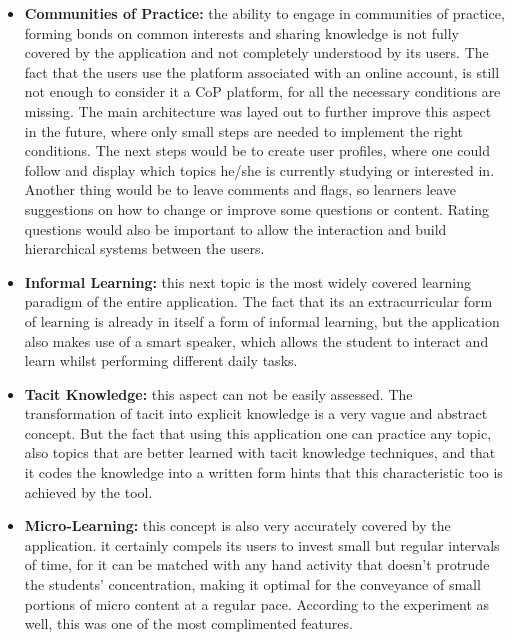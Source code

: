 \begin{itemize}
    \item \textbf{Communities of Practice: } the ability to engage in communities of practice, forming 
        bonds on common interests and sharing knowledge is not fully covered by the application and 
        not completely understood by its users. The fact that the users use the platform associated 
        with an online account, is still not enough to consider it a CoP platform, for all the necessary
        conditions are missing. The main architecture was layed out to further improve this aspect in
        the future, where only small steps are needed to implement the right conditions. The next steps
        would be to create user profiles, where one could follow and display which topics he/she is 
        currently studying or interested in. Another thing would be to leave comments and flags, so 
        learners leave suggestions on how to change or improve some questions or content. Rating questions
        would also be important to allow the interaction and build hierarchical systems between the users.
    \item \textbf{Informal Learning: } this next topic is the most widely covered learning paradigm 
        of the entire application. The fact that its an extracurricular form of learning is already
        in itself a form of informal learning, but the application also makes use of a smart speaker, 
        which allows the student to interact and learn whilst performing different daily tasks. 
    \item \textbf{Tacit Knowledge: } this aspect can not be easily assessed. The transformation of
        tacit into explicit knowledge is a very vague and abstract concept. But the fact that using this
        application one can practice any topic, also topics that are better learned with tacit 
        knowledge techniques, and that it codes the knowledge into a written form hints that this 
        characteristic too is achieved by the tool.
    \item \textbf{Micro-Learning: } this concept is also very accurately covered by the application. 
        it certainly compels its users to invest small but regular intervals of time, for it can be matched
        with any hand activity that doesn't protrude the students' concentration, making it optimal for
        the conveyance of small portions of micro content at a regular pace. According to the experiment
        as well, this was one of the most complimented features. 
\end{itemize}



